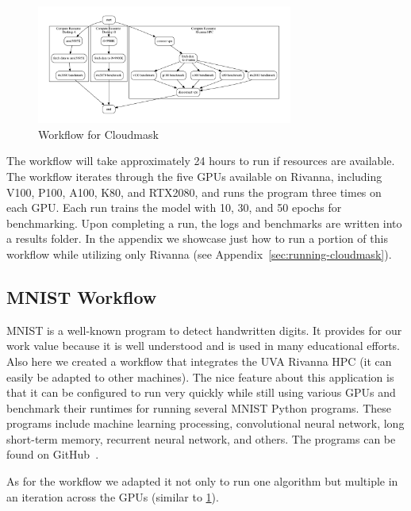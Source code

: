 \begin{figure}[htb]
\centering
\includegraphics[width=0.75\textwidth]{images/cloudmask-wf.pdf}
\caption{Workflow for Cloudmask}\label{fig:cloudmaskwf}
\end{figure}

The workflow will take approximately 24 hours to run if resources are
available. The workflow iterates through the five GPUs available on
Rivanna, including V100, P100, A100, K80, and RTX2080, and runs the program
three times on each GPU. Each run trains the model with 10, 30, and 50
epochs for benchmarking. Upon completing a run, the logs and
benchmarks are written into a results folder.
In the appendix we showcase just how to run a portion of this workflow
while utilizing only Rivanna (see Appendix~\ref{sec:running-cloudmask}).



%


\subsection{MNIST Workflow}\label{mnist-workflow}

MNIST is a well-known program to detect handwritten digits. It
provides for our work value because it is well understood and is used
in many educational efforts. Also here we created a workflow that
integrates the UVA Rivanna HPC (it can easily be adapted to other machines).
The nice feature about this application is that it can be configured
to run very quickly while still using various GPUs and benchmark their runtimes for running
several MNIST Python programs. These programs include machine learning
processing, convolutional neural network, long short-term memory,
recurrent neural network, and others. The programs can be found on
GitHub~\cite{www-mnist-programs}.

As for the workflow we adapted it not only to run one algorithm but
multiple in an iteration across the GPUs (similar to \ref{fig:cloudmaskwf}).

